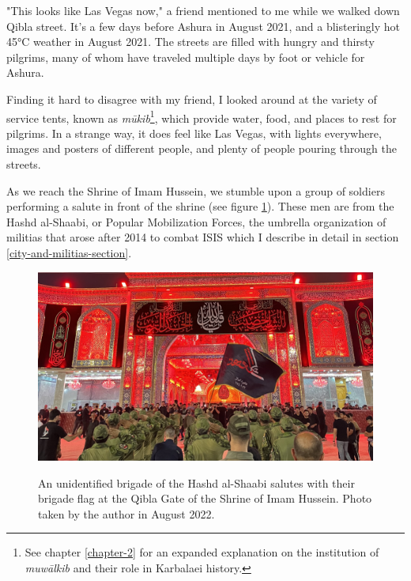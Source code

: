 "This looks like Las Vegas now," a friend mentioned to me while we walked down Qibla street. It's a few days before Ashura in August 2021, and a blisteringly hot 45°C weather in August 2021. The streets are filled with hungry and thirsty pilgrims, many of whom have traveled multiple days by foot or vehicle for Ashura. 

Finding it hard to disagree with my friend, I looked around at the variety of service tents, known as \emph{mūkib}\footnote{See chapter \ref{chapter-2} for an expanded explanation on the institution of \emph{muwālkib} and their role in Karbalaei history.}, which provide water, food, and places to rest for pilgrims. In a strange way, it does feel like Las Vegas, with lights everywhere, images and posters of different people, and plenty of people pouring through the streets. 


As we reach the Shrine of Imam Hussein, we stumble upon a group of soldiers performing a salute in front of the shrine (see figure \ref{fig:hashd-salute}). These men are from the Hashd al-Shaabi, or Popular Mobilization Forces, the umbrella organization of militias that arose after 2014 to combat ISIS which I describe in detail in section \ref{city-and-militias-section}. 

\begin{figure}
\caption{An unidentified brigade of the Hashd al-Shaabi salutes with their brigade flag at the Qibla Gate of the Shrine of Imam Hussein. Photo taken by the author in August 2022.}\centering
\includegraphics[width=.75\textwidth]{images/hashd-salutes.jpeg}
\label{fig:hashd-salute}
\end{figure}

